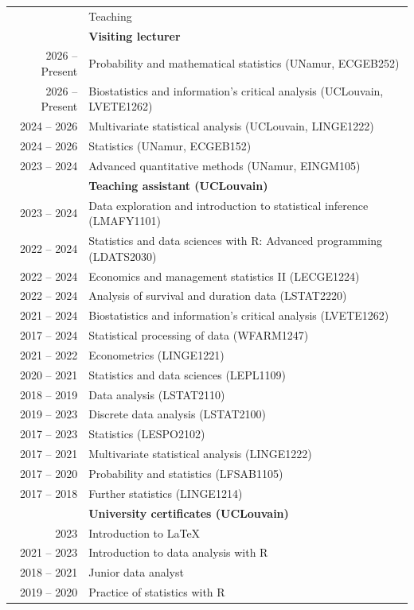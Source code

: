 \documentclass[letterpaper, 11pt]{article}
\newcommand{\headingfont}{\Large\color{OliveGreen}}
\newenvironment{SectionTableSingleSpace}[1]{
	\renewcommand*{\arraystretch}{1.2}
	\setlength{\tabcolsep}{10pt}
	\begin{longtable}{Rp{5.2in}} & #1 \\[0.6em]}
{\end{longtable}\vspace{-.3cm}}
\begin{document}
\begin{SectionTableSingleSpace}{\headingfont Teaching}

& \textbf{Visiting lecturer} \\
2026 -- Present & Probability and mathematical statistics (UNamur, ECGEB252) \\
2026 -- Present & Biostatistics and information's critical analysis (UCLouvain, LVETE1262) \\
2024 -- 2026 & Multivariate statistical analysis (UCLouvain, LINGE1222) \\
2024 -- 2026 & Statistics (UNamur, ECGEB152) \\
2023 -- 2024 & Advanced quantitative methods (UNamur, EINGM105)\\

& \textbf{\newline Teaching assistant (UCLouvain)}\\
2023 -- 2024 & Data exploration and introduction to statistical inference (LMAFY1101) \\
2022 -- 2024 & Statistics and data sciences with R: Advanced programming (LDATS2030) \\
2022 -- 2024 & Economics and management statistics II (LECGE1224) \\
2022 -- 2024 & Analysis of survival and duration data (LSTAT2220) \\
2021 -- 2024 & Biostatistics and information's critical analysis (LVETE1262) \\
2017 -- 2024 & Statistical processing of data (WFARM1247) \\
2021 -- 2022 & Econometrics (LINGE1221) \\
2020 -- 2021 & Statistics and data sciences (LEPL1109) \\
2018 -- 2019 & Data analysis (LSTAT2110) \\
2019 -- 2023 & Discrete data analysis (LSTAT2100) \\
2017 -- 2023 & Statistics (LESPO2102) \\
2017 -- 2021 & Multivariate statistical analysis (LINGE1222) \\
2017 -- 2020 & Probability and statistics (LFSAB1105) \\
2017 -- 2018 & Further statistics (LINGE1214)\\

& \textbf{\newline University certificates (UCLouvain)}\\
2023 & Introduction to LaTeX\\
2021 -- 2023 & Introduction to data analysis with R\\
2018 -- 2021 & Junior data analyst\\
2019 -- 2020 & Practice of statistics with R\\
\end{SectionTableSingleSpace}

\end{document}

